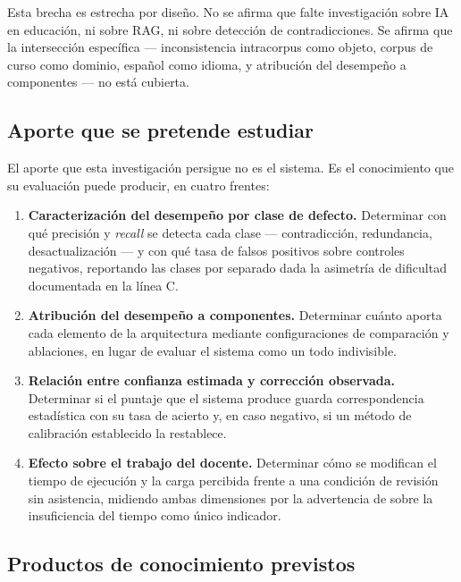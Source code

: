Esta brecha es estrecha por diseño. No se afirma que falte investigación sobre IA en
educación, ni sobre RAG, ni sobre detección de contradicciones. Se afirma que la
intersección específica --- inconsistencia intracorpus como objeto, corpus de curso
como dominio, español como idioma, y atribución del desempeño a componentes --- no
está cubierta.

\subsection{Aporte que se pretende estudiar}
\label{sec:brecha-aporte}

El aporte que esta investigación persigue no es el sistema. Es el conocimiento que su
evaluación puede producir, en cuatro frentes:

\begin{enumerate}
  \item \textbf{Caracterización del desempeño por clase de defecto.} Determinar con
        qué precisión y \emph{recall} se detecta cada clase --- contradicción,
        redundancia, desactualización --- y con qué tasa de falsos positivos sobre
        controles negativos, reportando las clases por separado dada la asimetría de
        dificultad documentada en la línea C.
  \item \textbf{Atribución del desempeño a componentes.} Determinar cuánto aporta cada
        elemento de la arquitectura mediante configuraciones de comparación y
        ablaciones, en lugar de evaluar el sistema como un todo indivisible.
  \item \textbf{Relación entre confianza estimada y corrección observada.}
        Determinar si el puntaje que el sistema produce guarda correspondencia
        estadística con su tasa de acierto y, en caso negativo, si un método de
        calibración establecido la restablece.
  \item \textbf{Efecto sobre el trabajo del docente.} Determinar cómo se modifican el
        tiempo de ejecución y la carga percibida frente a una condición de revisión
        sin asistencia, midiendo ambas dimensiones por la advertencia de
        \textcite{su2026efficiency} sobre la insuficiencia del tiempo como único
        indicador.
\end{enumerate}

\subsection{Productos de conocimiento previstos}
\label{sec:brecha-productos}

